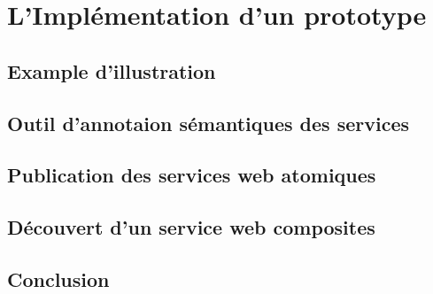 \chapter{L'Implémentation d'un prototype}

\section{Example d'illustration}
\label{sec:example-dill}
\section{Outil d'annotaion sémantiques des services}
\label{sec:outil-dann-semant}
\section{Publication des services web atomiques}
\label{sec:atomic-publication}
\section{Découvert d'un service web composites}
\label{sec:composite-discovery}
\section{Conclusion}
\label{sec:Conclusion}

